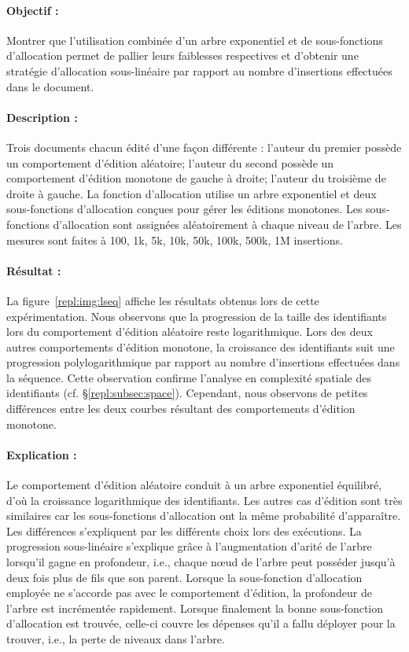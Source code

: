 \paragraph{Objectif :} Montrer que l'utilisation combinée d'un arbre exponentiel
et de sous-fonctions d'allocation permet de pallier leurs faiblesses respectives
et d'obtenir une stratégie d'allocation sous-linéaire par rapport au nombre
d'insertions effectuées dans le document.

\paragraph{Description :} Trois documents chacun édité d'une façon différente :
l'auteur du premier possède un comportement d'édition aléatoire; l'auteur du
second possède un comportement d'édition monotone de gauche à droite; l'auteur
du troisième de droite à gauche. La fonction d'allocation utilise un arbre
exponentiel et deux sous-fonctions d'allocation conçues pour gérer les éditions
monotones. Les sous-fonctions d'allocation sont assignées aléatoirement à chaque
niveau de l'arbre. Les mesures sont faites à 100, 1k, 5k, 10k, 50k, 100k, 500k,
1M insertions.

\paragraph{Résultat :} La figure~\ref{repl:img:lseq} affiche les résultats
obtenus lors de cette expérimentation. Nous observons que la progression de la
taille des identifiants lors du comportement d'édition aléatoire reste
logarithmique. Lors des deux autres comportements d'édition monotone, la
croissance des identifiants suit une progression polylogarithmique par rapport au
nombre d'insertions effectuées dans la séquence. Cette observation confirme
l'analyse en complexité spatiale des identifiants
(cf. §\ref{repl:subsec:space}). Cependant, nous observons de petites
différences entre les deux courbes résultant des comportements d'édition monotone.

\paragraph{Explication :} Le comportement d'édition aléatoire conduit à un arbre
exponentiel équilibré, d'où la croissance logarithmique des identifiants. Les
autres cas d'édition sont très similaires car les sous-fonctions d'allocation
ont la même probabilité d'apparaître. Les différences s'expliquent par les
différents choix lors des exécutions. La progression sous-linéaire s'explique
grâce à l'augmentation d'arité de l'arbre lorsqu'il gagne en profondeur, i.e.,
chaque nœud de l'arbre peut posséder jusqu'à deux fois plus de fils que son
parent. Lorsque la sous-fonction d'allocation employée ne s'accorde pas avec le
comportement d'édition, la profondeur de l'arbre est incrémentée
rapidement. Lorsque finalement la bonne sous-fonction d'allocation est trouvée,
celle-ci couvre les dépenses qu'il a fallu déployer pour la trouver, i.e., la
perte de niveaux dans l'arbre.

